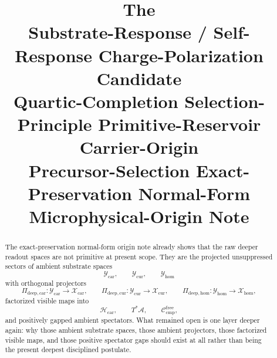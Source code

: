 \documentclass[11pt]{article}
\title{\textbf{The \TheoryName{}}\\[0.4em]
\large Substrate-Response / Self-Response Charge-Polarization Candidate\\
\large Quartic-Completion Selection-Principle Primitive-Reservoir Carrier-Origin\\
\large Precursor-Selection Exact-Preservation Normal-Form Microphysical-Origin Note}
\author{}
\date{}
\newcommand{\Sub}{\mathcal A}
\newcommand{\CompFree}{\mathscr C_{\mathrm{cmp}}^{\mathrm{free}}}
\newcommand{\CarrierClass}{\mathscr H_{\mathrm{car}}}
\newcommand{\DeepTensorClass}{\mathscr X_{\mathrm{car}}}
\newcommand{\DeepRelabelClass}{\mathscr X_{\mathrm{cur}}}
\newcommand{\DeepFreeClass}{\mathscr X_{\mathrm{hom}}}
\newcommand{\ProtoTensorClass}{\mathscr Y_{\mathrm{car}}}
\newcommand{\ProtoRelabelClass}{\mathscr Y_{\mathrm{cur}}}
\newcommand{\ProtoFreeClass}{\mathscr Y_{\mathrm{hom}}}
\newcommand{\ProtoCarProj}{\Pi_{\mathrm{deep,car}}}
\newcommand{\ProtoCurProj}{\Pi_{\mathrm{deep,cur}}}
\newcommand{\ProtoHomProj}{\Pi_{\mathrm{deep,hom}}}
\begin{document}
\maketitle

\begin{abstract}
The exact-preservation normal-form origin note already shows that the raw deeper readout spaces are not primitive at present scope. They are the projected unsuppressed sectors of ambient substrate spaces
\[
\ProtoTensorClass,\qquad
\ProtoRelabelClass,\qquad
\ProtoFreeClass
\]
with orthogonal projectors
\[
\ProtoCarProj:\ProtoTensorClass\to\DeepTensorClass,
\qquad
\ProtoCurProj:\ProtoRelabelClass\to\DeepRelabelClass,
\qquad
\ProtoHomProj:\ProtoFreeClass\to\DeepFreeClass,
\]
factorized visible maps into
\[
\CarrierClass,\qquad
T^*\Sub,\qquad
\CompFree,
\]
and positively gapped ambient spectators. What remained open is one layer deeper again: why those ambient substrate spaces, those ambient projectors, those factorized visible maps, and those positive spectator gaps should exist at all rather than being the present deepest disciplined postulate.


\end{abstract}
\end{document}
